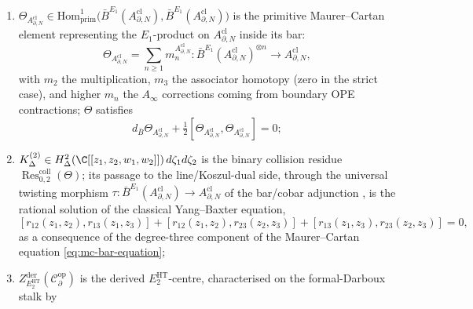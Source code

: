 \begin{thm}
\begin{enumerate}[label=\textup{(\roman*)}]
        \(K^{(2)}_\Delta=d\zeta_1d\zeta_2/(\zeta_1\zeta_2)\) of
        Proposition~\ref{prop:diagonal-cohomology-operad};
  \item \(\Theta_{A^{\mathrm{cl}}_{\partial,N}}\in
        \mathrm{Hom}^1_{\mathrm{prim}}\bigl(
          \bar B^{E_1}(A^{\mathrm{cl}}_{\partial,N}),
          \bar B^{E_1}(A^{\mathrm{cl}}_{\partial,N})\bigr)\) is the
        primitive Maurer--Cartan element representing the
        \(E_1\)-product on \(A^{\mathrm{cl}}_{\partial,N}\) inside its
        bar:
        \[
          \Theta_{A^{\mathrm{cl}}_{\partial,N}}
            =\sum_{n\ge 1}m_n^{A^{\mathrm{cl}}_{\partial,N}}
              \colon\bar B^{E_1}(A^{\mathrm{cl}}_{\partial,N})^{\otimes n}
              \to A^{\mathrm{cl}}_{\partial,N},
        \]
        with \(m_2\) the multiplication, \(m_3\) the associator
        homotopy (zero in the strict case), and higher \(m_n\) the
        \(A_\infty\) corrections coming from boundary OPE
        contractions; \(\Theta\) satisfies
\begin{equation}\label{eq:mc-bar-equation}
          d_{\bar B}\Theta_{A^{\mathrm{cl}}_{\partial,N}}
            +\tfrac12[\Theta_{A^{\mathrm{cl}}_{\partial,N}},
                       \Theta_{A^{\mathrm{cl}}_{\partial,N}}]=0;
\end{equation}
  \item \(K^{(2)}_\Delta\in
        H^2_\Delta(\C[[z_1,z_2,w_1,w_2]])\,d\zeta_1d\zeta_2\) is the
        binary collision residue
        \(\operatorname{Res}^{\mathrm{coll}}_{0,2}(\Theta)\); its
        passage to the line/Koszul-dual side, through the universal
        twisting morphism
        \(\tau\colon\bar B^{E_1}(A^{\mathrm{cl}}_{\partial,N})\to
        A^{\mathrm{cl}}_{\partial,N}\) of the bar/cobar adjunction
        \cite{loday-vallette}\cite{kontsevich-dq}\cite{tamarkin-deligne},
        is the rational solution of the classical Yang--Baxter equation,
\begin{equation}\label{eq:cybe-from-mc-degree-three}
          [r_{12}(z_1,z_2),r_{13}(z_1,z_3)]
          +[r_{12}(z_1,z_2),r_{23}(z_2,z_3)]
          +[r_{13}(z_1,z_3),r_{23}(z_2,z_3)]=0,
\end{equation}
        as a consequence of the degree-three component of the
        Maurer--Cartan equation \eqref{eq:mc-bar-equation};
  \item \(Z^{\mathrm{der}}_{E_2^{\mathrm{HT}}}(
        \mathcal C^{\mathrm{op}}_\partial)\) is the derived
        \(E_2^{\mathrm{HT}}\)-centre, characterised on the
        formal-Darboux stalk by
\begin{equation}\label{eq:bar-resolution-derived-centre}

\end{equation}
\end{enumerate}
\end{thm}
